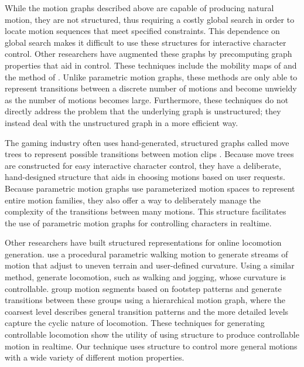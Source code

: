 \documentclass[10pt,twocolumn]{article}
\begin{document}
While the motion graphs described above are capable of producing natural motion, they are not structured, thus requiring a costly global search in order to locate motion sequences that meet specified constraints. This dependence on global search makes it difficult to use these structures for interactive character control. Other researchers have augmented these graphs by precomputing graph properties that aid in control. These techniques include the mobility maps of \citet{srinivasan2005} and the method of \citet{lee2004}. Unlike parametric motion graphs, these methods are only able to represent transitions between a discrete number of motions and become unwieldy as the number of motions becomes large. Furthermore, these techniques do not directly address the problem that the underlying graph is unstructured; they instead deal with the unstructured graph in a more efficient way.

The gaming industry often uses hand-generated, structured graphs called move trees to represent possible transitions between motion clips \citep{mizuguchi2001}. Because move trees are constructed for easy interactive character control, they have a deliberate, hand-designed structure that aids in choosing motions based on user requests. Because parametric motion graphs use parameterized motion spaces to represent entire motion families, they also offer a way to deliberately manage the complexity of the transitions between many motions. This structure facilitates the use of parametric motion graphs for controlling characters in realtime.

Other researchers have built structured representations for online locomotion generation. \citet{sun2001} use a procedural parametric walking motion to generate streams of motion that adjust to uneven terrain and user-defined curvature. Using a similar method, \citet{park2002} generate locomotion, such as walking and jogging, whose curvature is controllable. \citet{kwon2005} group motion segments based on footstep patterns and generate transitions between these groups using a hierarchical motion graph, where the coarsest level describes general transition patterns and the more detailed levels capture the cyclic nature of locomotion. These techniques for generating controllable locomotion show the utility of using structure to produce controllable motion in realtime. Our technique uses structure to control more general motions with a wide variety of different motion properties.
\end{document}
